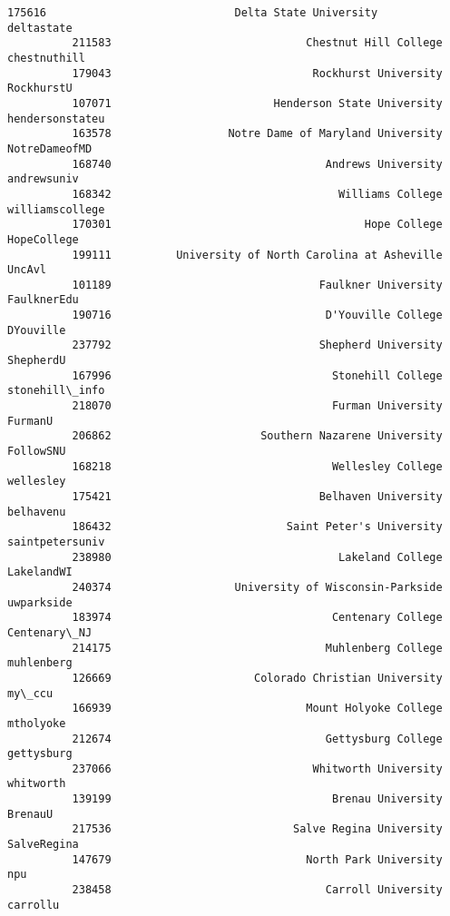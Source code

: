 \documentclass[11pt]{article}
\begin{document}
\begin{Verbatim}[commandchars=\\\{\}]
          175616                             Delta State University       deltastate   
          211583                              Chestnut Hill College     chestnuthill   
          179043                               Rockhurst University       RockhurstU   
          107071                         Henderson State University  hendersonstateu   
          163578                  Notre Dame of Maryland University    NotreDameofMD   
          168740                                 Andrews University      andrewsuniv   
          168342                                   Williams College  williamscollege   
          170301                                       Hope College      HopeCollege   
          199111          University of North Carolina at Asheville           UncAvl   
          101189                                Faulkner University      FaulknerEdu   
          190716                                 D'Youville College        DYouville   
          237792                                Shepherd University        ShepherdU   
          167996                                  Stonehill College   stonehill\_info   
          218070                                  Furman University          FurmanU   
          206862                       Southern Nazarene University        FollowSNU   
          168218                                  Wellesley College        wellesley   
          175421                                Belhaven University        belhavenu   
          186432                           Saint Peter's University  saintpetersuniv   
          238980                                   Lakeland College       LakelandWI   
          240374                   University of Wisconsin-Parkside       uwparkside   
          183974                                  Centenary College     Centenary\_NJ   
          214175                                 Muhlenberg College       muhlenberg   
          126669                      Colorado Christian University           my\_ccu   
          166939                              Mount Holyoke College        mtholyoke   
          212674                                 Gettysburg College       gettysburg   
          237066                               Whitworth University        whitworth   
          139199                                  Brenau University          BrenauU   
          217536                            Salve Regina University      SalveRegina   
          147679                              North Park University              npu   
          238458                                 Carroll University         carrollu   

\end{Verbatim}
\end{document}
